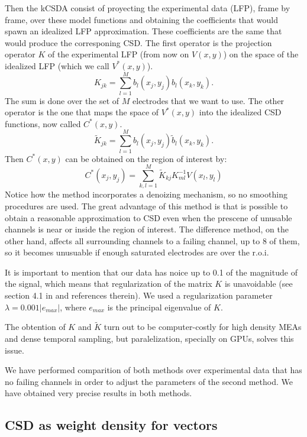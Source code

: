 \documentclass{article}
\begin{document}
Then the kCSDA consist of proyecting the experimental data (LFP), frame by frame,
over these model functions and obtaining the  coefficients that would spawn an idealized
LFP approximation. These coefficients are the same that would produce the
corresponing CSD. The first operator is the projection operator $K$ of the experimental
LFP (from now on $V(x,y)$) on the space of the idealized LFP (which we call $V^* (x,y)$).
\begin{equation}
  K_{jk}=\sum_{l=1}^{M}b_l(x_j,y_j)b_l(x_k,y_k).
\end{equation}
The sum is done over the set of $M$ electrodes that we want to use.
The other operator is the one that maps the space of $V^*(x,y)$ into the idealized
CSD functions, now called $C^*(x,y)$. 
\begin{equation}
  \tilde{K}_{jk}=\sum_{l=1}^Mb_l(x_j,y_j)\tilde{b}_l(x_k,y_k).
\end{equation}
Then $C^*(x,y)$ can be obtained on the region of interest by:
\begin{equation}
  C^*(x_j,y_j)=\sum_{k,l=1}^M \tilde{K}_{kj} K^{-1}_{ml} V(x_l,y_l)
\end{equation}
Notice how the method incorporates a denoizing mechanism, so
no smoothing procedures are used.
The great advantage of this method is that is possible to obtain a reasonable
approximation to CSD even when the prescene of unusable channels is near or inside
the region of interest. The difference method, on the other hand, affects all surrounding
channels to a failing channel, up to 8 of them, so it becomes unusuable if enough
saturated electrodes are over the r.o.i.

It is important to mention that our data has noice up to 0.1 of the magnitude of the
signal, which means that regularization of the matrix $K$ is unavoidable (see section 4.1 in \cite{Potworowski2011} and references therein). We used a regularization parameter $\lambda=0.001 |e_{max}|$, where $e_{max}$ is the principal eigenvalue of $K$. 

The obtention of $K$ and $\tilde{K}$ turn out to be computer-costly for high density MEAs and dense temporal sampling, but paralelization, specially on
GPUs, solves this issue.

We have performed comparition of both methods over experimental data that has
no failing channels in order to adjust the parameters of the second method. We
have obtained very precise results in both methods.


\subsection{CSD as weight density for vectors}
\end{document}
